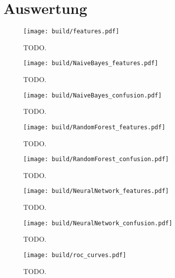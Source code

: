 \section{Auswertung}
\label{sec:Auswertung}

\begin{figure}[H]
  \centering
  \texttt{[image: build/features.pdf]}
  \caption{TODO.}
  \label{fig:features}
\end{figure}

\begin{figure}[H]
  \centering
  \texttt{[image: build/NaiveBayes\_features.pdf]}
  \caption{TODO.}
  \label{fig:NaiveBayes_features}
\end{figure}

\begin{figure}[H]
  \centering
  \texttt{[image: build/NaiveBayes\_confusion.pdf]}
  \caption{TODO.}
  \label{fig:NaiveBayes_confusion}
\end{figure}

\begin{figure}[H]
  \centering
  \texttt{[image: build/RandomForest\_features.pdf]}
  \caption{TODO.}
  \label{fig:RandomForest_features}
\end{figure}

\begin{figure}[H]
  \centering
  \texttt{[image: build/RandomForest\_confusion.pdf]}
  \caption{TODO.}
  \label{fig:RandomForest_confusion}
\end{figure}

\begin{figure}[H]
  \centering
  \texttt{[image: build/NeuralNetwork\_features.pdf]}
  \caption{TODO.}
  \label{fig:NeuralNetwork_features}
\end{figure}

\begin{figure}[H]
  \centering
  \texttt{[image: build/NeuralNetwork\_confusion.pdf]}
  \caption{TODO.}
  \label{fig:NeuralNetwork_confusion}
\end{figure}

\begin{figure}[H]
  \centering
  \texttt{[image: build/roc\_curves.pdf]}
  \caption{TODO.}
  \label{fig:roc_curves}
\end{figure}
